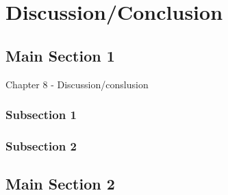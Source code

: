 
\chapter{Discussion/Conclusion} %

\label{Chapter8} %


\section{Main Section 1}
Chapter 8
- Discussion/conslusion


\subsection{Subsection 1}



\subsection{Subsection 2}


\section{Main Section 2}

